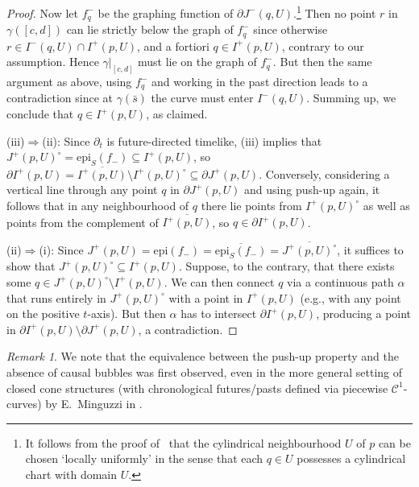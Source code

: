 \documentclass[reqno]{amsart}
\numberwithin{equation}{section}
\theoremstyle{plain}
\theoremstyle{definition}
\theoremstyle{remark}
\newtheorem{remark}[theorem]{Remark}
\newcommand{\Con}{\mathcal{C}}
\newcommand{\sse}{\subseteq}
\begin{document}
\begin{proof}
Now let $f_q^-$ be the graphing function of $\partial J^-(q,U)$.\footnote{It follows from the proof of~\cite[Prop.\ 1.10]{CG:12}
	that the cylindrical neighbourhood $U$ of $p$ can be chosen `locally uniformly' in the sense that each $q\in U$ possesses a
	cylindrical chart with domain $U$.} Then no point $r$ in $\gamma([c,d])$ can lie strictly below the graph of $f_q^-$ 
since otherwise 
$r \in I^-(q,U) \cap I^+(p,U)$, and a fortiori $q\in I^+(p,U)$, contrary to our assumption. Hence $\gamma|_{[c,d]}$ must lie
on the graph of $f_q^-$. But then the same argument as above, using $f_q^-$ and working in the past 
direction leads to a contradiction since at $\gamma(\bar s)$ the curve must enter $I^-(q,U)$. Summing up, we conclude
that $q\in I^+(p,U)$, as claimed.

\noindent(iii)$\Rightarrow$(ii): Since $\partial_t$ is future-directed timelike, (iii) implies that 
$J^+(p,U)^\circ = \mathrm{epi}_S(f_-) \sse I^+(p,U)$, so $\partial I^+(p,U) = \overline{I^+(p,U)}\setminus I^+(p,U)^\circ
\subseteq \partial J^+(p,U)$. Conversely, considering a vertical line through any point $q$ in $\partial J^+(p,U)$ and using
push-up again, it follows
that in any neighbourhood of $q$ there lie points from $I^+(p,U)^\circ$ as well as points from the complement of $\overline{I^+(p,U)}$,
so $q\in \partial I^+(p,U)$.

\noindent(ii)$\Rightarrow$(i): Since $J^+(p,U)=\mathrm{epi}(f_-) = \overline{\mathrm{epi}_S(f_-)}=\overline{J^+(p,U)^\circ}$,
it suffices to show that $J^+(p,U)^\circ \sse I^+(p,U)$. Suppose, to the contrary, that there exists some $q\in 
J^+(p,U)^\circ \setminus I^+(p,U)$. We can then connect $q$ via a continuous path $\alpha$ that runs entirely in $J^+(p,U)^\circ$
with a point in $I^+(p,U)$ (e.g., with any point on the positive $t$-axis). But then $\alpha$ has to intersect
$\partial I^+(p,U)$, producing a point in $\partial I^+(p,U)\setminus \partial J^+(p,U)$, a contradiction.
\end{proof}
\begin{remark} We note that the equivalence between the push-up property and the absence
of causal bubbles was first observed, even in the more general setting of closed cone
structures (with chronological futures/pasts defined via piecewise $\Con^1$-curves) 
by E.\ Minguzzi in \cite[Thm.\ 2.8]{Min:19}. 
\end{remark}
\end{document}
